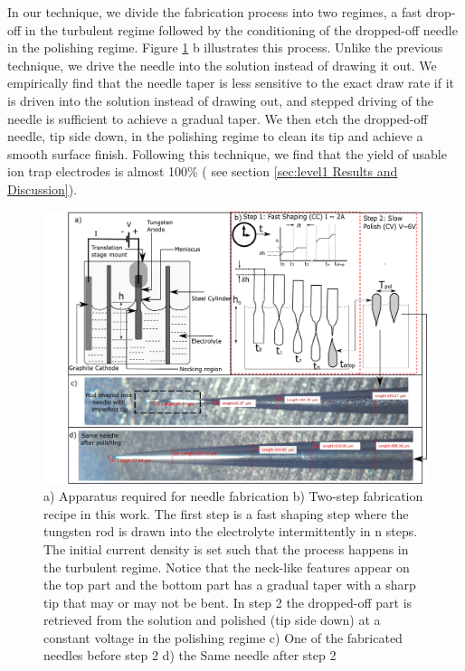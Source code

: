\documentclass[%
 aip,
 amsmath,amssymb,
 reprint,%
]{revtex4-1}
\begin{document}
In our technique, we divide the fabrication process into two regimes, a fast drop-off in the turbulent regime followed by the conditioning of the dropped-off needle in the polishing regime.
Figure \ref{needle_polishing_basic_idea} b illustrates this process.
Unlike the previous technique, \cite{Wang2016} we drive the needle into the solution instead of drawing it out.
We empirically find that the needle taper is less sensitive to the exact draw rate if it is driven into the solution instead of drawing out, and stepped driving of the needle is sufficient to achieve a gradual taper.
We then etch the dropped-off needle, tip side down, in the polishing regime to clean its tip and achieve a smooth surface finish.
Following this technique, we find that the yield of usable ion trap electrodes is almost 100\% ( see section \ref{sec:level1 Results and Discussion}).

\begin{figure}
    \centering
    \includegraphics[width =1.0
    \linewidth]{Electropolishing_Rod.pdf}
    \caption{a) Apparatus required for needle fabrication b) Two-step fabrication recipe in this work. 
    The first step is a fast shaping step where the tungsten rod is drawn into the electrolyte intermittently in n steps. 
    The initial current density is set such that the process happens in the turbulent regime. 
    Notice that the neck-like features appear on the top part and the bottom part has a gradual taper with a sharp tip that may or may not be bent. 
    In step 2 the dropped-off part is retrieved from the solution and polished (tip side down) at a constant voltage in the polishing regime c) One of the fabricated needles before step 2 d) the Same needle after step 2}
    \label{needle_polishing_basic_idea}
    
\end{figure}
\end{document}
